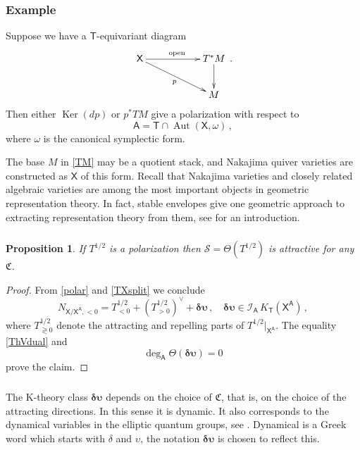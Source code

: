 \documentclass[14pt]{extarticle}
\newcommand{\bT}{\mathsf{T}}
\newcommand{\bA}{\mathsf{A}}
\newcommand{\bX}{\mathsf{X}}
\newcommand{\cI}{\mathscr{I}}
\newcommand{\du}{\boldsymbol{\delta\upsilon}}
\newcommand{\fC}{\mathfrak{C}}
\newcommand{\cS}{\mathscr{S}}
\DeclareMathOperator{\Ker}{Ker}
\DeclareMathOperator{\Aut}{Aut}
\newtheorem{Proposition}[Lemma]{Proposition}
\theoremstyle{definition}
\begin{document}
\subsubsection{Example} \label{ex1} 
 Suppose we  have a $\bT$-equivariant diagram 
%
 \begin{equation}
\xymatrix{
  \bX \ar[rr]^{\textup{open}} \ar[rrd]_{p}&& T^*M  \ar[d]\\
  && M}  \,. \label{TM}
\end{equation}
%
Then either $\Ker(dp)$ or $p^*TM$ give a polarization with
respect to
$$
\bA = \bT \cap \Aut(\bX,\omega) \,, 
$$
where $\omega$ is the canonical symplectic form.

The base $M$ in \eqref{TM}  may be a
quotient
stack, and Nakajima quiver
varieties \cite{Nak1} are constructed as $\bX$ of this form. Recall that
Nakajima varieties and closely related algebraic varieties are among
the most important objects in geometric representation theory. In
fact, stable envelopes give one geometric approach to extracting 
representation theory from them, see \cites{MO1, Opcmi} for an
introduction. 

\subsubsection{}


\begin{Proposition}
 If $T^{1/2}$ is a polarization then $\cS=\Theta(T^{1/2})$ is
 attractive for any $\fC$. 
\end{Proposition}

\begin{proof}
  {}From \eqref{polar} and \eqref{TXsplit} we conclude 
%
\begin{equation}
  \label{TXs}
 N_{\bX/\bX^\bA,<0}   = T^{1/2}_{<0} +
 \left(T^{1/2}_{>0}\right)^\vee+\du \,, \quad \du \in \cI_\bA \, K_\bT(\bX^\bA) \,, 
\end{equation}
%
where $T^{1/2}_{\gtrless 0}$ denote the attracting and repelling
parts of $T^{1/2}\big|_{\bX^\bA}$.
The equality \eqref{ThVdual} and
$$
\deg_\bA \Theta(\du) = 0
$$
prove the claim. 
\end{proof}


\subsubsection{}



The K-theory class $\du$ depends on the choice of $\fC$, that is, on
the choice of the attracting directions. In this sense it is
dynamic. It also corresponds to the dynamical variables in the
elliptic quantum groups, see \cite{ese}. Dynamical is a Greek word which
starts with $\delta$ and $\upsilon$, the notation $\du$ is chosen
to reflect this. 
\end{document}
